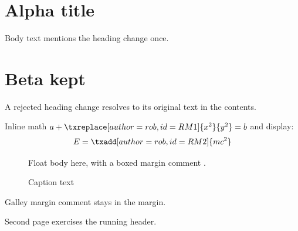 \documentclass{article}
\begin{document}
\tableofcontents
\listoffigures

\section{Alpha  title}
Body text mentions the heading change once.

\section{Beta  kept}
A rejected heading change resolves to its original text in the contents.

Inline math $a + \txreplace[author=rob, id=RM1]{x^2}{y^2} = b$ and display:
\begin{equation}
E = \txadd[author=rob, id=RM2]{mc^2}
\end{equation}

\begin{figure}[h]
\centering
Float body  here,
with a boxed margin comment .
\caption{Caption  text}
\end{figure}

Galley margin comment  stays in the margin.

\newpage
Second page exercises the running header.

\txlistofchanges
\end{document}
